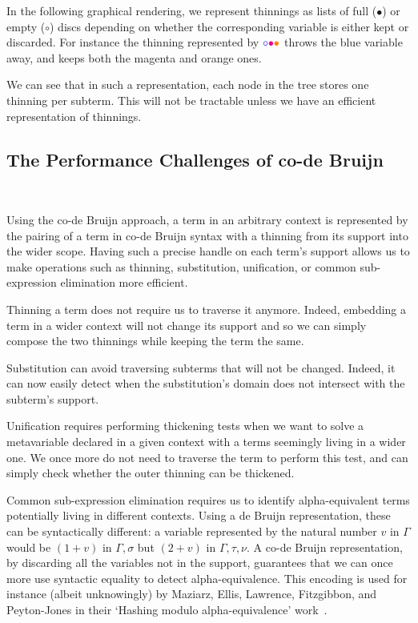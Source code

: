 In the following graphical rendering, we represent thinnings as lists of full
($\bullet$) or empty ($\circ$) discs depending on whether the corresponding
variable is either kept or discarded.
For instance the thinning represented by
$\color{blue}{\circ}\color{magenta}{\bullet}\color{orange}{\bullet}$
throws the {\color{blue}blue} variable away, and keeps both the
{\color{magenta}magenta} and {\color{orange}orange} ones.


We can see that in such a representation, each node in the tree stores one
thinning per subterm. This will not be tractable unless we have an efficient
representation of thinnings.

\subsection{The Performance Challenges of co-de Bruijn}~\label{sec:thinningsintypos}

Using the co-de Bruijn approach, a term in an arbitrary context is represented
by the pairing of a term in co-de Bruijn syntax with a thinning from its support
into the wider scope.
%
Having such a precise handle on each term's support allows us to make operations
such as thinning, substitution, unification, or common sub-expression elimination
more efficient.

Thinning a term does not require us to traverse it anymore.
%
Indeed, embedding a term in a wider context will not change its support
and so we can simply compose the two thinnings while keeping the term the same.

Substitution can avoid traversing subterms that will not
be changed. Indeed, it can now easily detect when the substitution's domain
does not intersect with the subterm's support.

Unification requires performing thickening tests when we want to
solve a metavariable declared in a given context with a terms seemingly living
in a wider one. We once more do not need to traverse the term to perform this
test, and can simply check whether the outer thinning can be thickened.

Common sub-expression elimination requires us to identify alpha-equivalent terms
potentially living in different contexts. Using a de Bruijn representation, these
can be syntactically different: a variable represented by the natural number $v$
in $\Gamma$ would be $(1+v)$ in $\Gamma,\sigma$ but $(2+v)$ in $\Gamma,\tau,\nu$.
%
A co-de Bruijn representation, by discarding all the variables not in the support,
guarantees that we can once more use syntactic equality to detect alpha-equivalence.
%
This encoding is used for instance (albeit unknowingly) by Maziarz, Ellis,
Lawrence, Fitzgibbon, and Peyton-Jones in their
`Hashing modulo alpha-equivalence' work~\cite{DBLP:conf/pldi/MaziarzELFJ21}.

